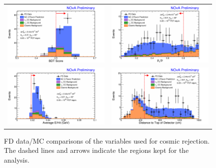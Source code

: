 \begin{figure}[htbp]
  \centering
  \begin{tabular}{c c}
    \includegraphics[width=.47\textwidth]{figures/FDDataMC/FDCosBDTStack.png} &
    \includegraphics[width=.47\textwidth]{figures/FDDataMC/FDPTPStack.png} \\
    \includegraphics[width=.47\textwidth]{figures/FDDataMC/FDEperHitStack.png} &
    \includegraphics[width=.47\textwidth]{figures/FDDataMC/FDDistTopStack.png} \\
  \end{tabular}
  \caption[FD Data/MC Comparison: Cosmic Rejection Variable Distributions]{FD data/MC comparisons of the variables used for cosmic rejection. The dashed lines and arrows indicate the regions kept for the analysis.}
  \label{fig:FDDataMCCosRej}
\end{figure}


